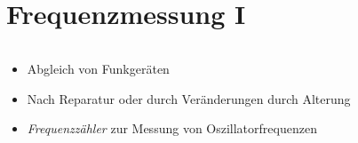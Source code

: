 
\section{Frequenzmessung I}
\label{section:frequenzmessung_1}
\begin{frame}%

\begin{columns}
    \begin{column}{0.48\textwidth}
    \begin{itemize}
  \item Abgleich von Funkgeräten
  \item Nach Reparatur oder durch Veränderungen durch Alterung
  \item \emph{Frequenzzähler} zur Messung von Oszillatorfrequenzen
  \end{itemize}

    \end{column}
   \begin{column}{0.48\textwidth}
       

\end{column}
\end{columns}
\end{frame}
